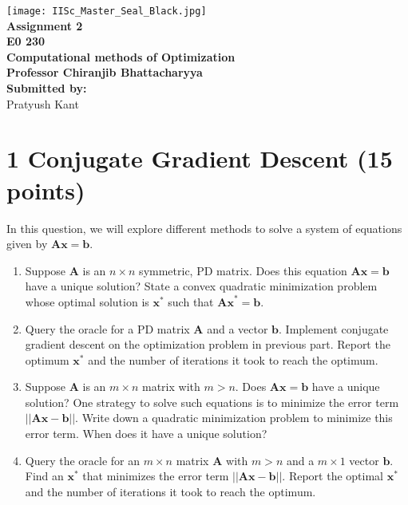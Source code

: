 \documentclass[12pt,a4paper]{article}
\theoremstyle{remark}
\begin{document}
\begin{titlepage}
    \centering
    \vspace*{2cm}  %

    \texttt{[image: IISc\_Master\_Seal\_Black.jpg]}\\[1cm]

     \Huge\textbf{Assignment 2}\\[0.5cm]
    \Huge\textbf{E0 230}\\[0.5cm]
    \LARGE\textbf{Computational methods of Optimization}\\[1cm]

    \Large\textbf{Professor Chiranjib Bhattacharyya}\\[0.5cm]

    \Large\textbf{Submitted by:}\\[0.5cm]
    \Large Pratyush Kant\\[0.5cm]
\end{titlepage}

\section*{1 Conjugate Gradient Descent (15 points)}

In this question, we will explore different methods to solve a system of equations given by $\mathbf{Ax = b}$.

\begin{enumerate}
    \item Suppose $\mathbf{A}$ is an $n \times n$ symmetric, PD matrix. Does this equation $\mathbf{Ax = b}$ have a unique solution? State a convex quadratic minimization problem whose optimal solution is $\mathbf{x}^*$ such that $\mathbf{Ax}^* = \mathbf{b}$.
    \item Query the oracle for a PD matrix $\mathbf{A}$ and a vector $\mathbf{b}$. Implement conjugate gradient descent on the optimization problem in previous part. Report the optimum $\mathbf{x}^*$ and the number of iterations it took to reach the optimum.
    \item Suppose $\mathbf{A}$ is an $m \times n$ matrix with $m > n$. Does $\mathbf{Ax = b}$ have a unique solution? One strategy to solve such equations is to minimize the error term $||\mathbf{Ax - b}||$. Write down a quadratic minimization problem to minimize this error term. When does it have a unique solution?
    \item Query the oracle for an $m \times n$ matrix $\mathbf{A}$ with $m > n$ and a $m \times 1$ vector $\mathbf{b}$. Find an $\mathbf{x}^*$ that minimizes the error term $||\mathbf{Ax - b}||$. Report the optimal $\mathbf{x}^*$ and the number of iterations it took to reach the optimum.
\end{enumerate}
\end{document}
